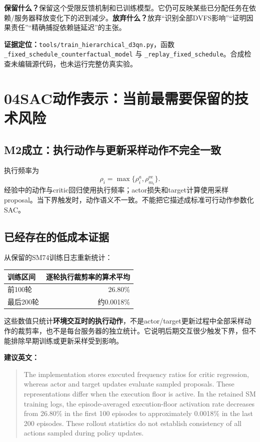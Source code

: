 \documentclass[UTF8,11pt,a4paper,fontset=fandol]{ctexart}
\newenvironment{draft}{\begin{quote}\small\setlength{\parskip}{4pt}}{\end{quote}}
\newcommand{\partpage}[2]{\section*{#1\quad #2}}
\newcommand{\code}[1]{\nolinkurl{#1}}
\begin{document}
\begin{decision}
\textbf{保留什么？}保留这个受限反馈机制和已训练模型。它仍可反映某些已分配任务在依赖/服务器释放变化下的迟到减少。\textbf{放弃什么？}放弃“识别全部DVFS影响”“证明因果责任”“精确捕捉依赖链延迟”的主张。
\end{decision}

\textbf{证据定位：}\code{tools/train_hierarchical_d3qn.py}，函数\newline
\code{_fixed_schedule_counterfactual_model} 与 \code{_replay_fixed_schedule}。合成检查未编辑源代码，也未运行完整仿真实验。

\newpage
\partpage{04}{SAC动作表示：当前最需要保留的技术风险}
\subsection*{M2成立：执行动作与更新采样动作不完全一致}
执行频率为
\[
\rho_i=\max\{\rho_i^a,\rho_{m_i}^{\mathrm{ee}}\}.
\]
经验中的动作与critic回归使用执行频率；actor损失和target计算使用采样proposal。当下界触发时，动作语义不一致。不能把它描述成标准可行动作参数化SAC。

\subsection*{已经存在的低成本证据}
从保留的SM74训练日志重新统计：
\begin{center}
\begin{tabular}{@{}lr@{}}
\toprule
训练区间 & 逐轮执行裁剪率的算术平均\\\midrule
前100轮 & 26.80\%\\
最后200轮 & 约0.0018\%\\\bottomrule
\end{tabular}
\end{center}
这些数值只统计\textbf{环境交互时的执行动作}，不是actor/target更新过程中全部采样动作的裁剪率，也不是每台服务器的独立统计。它说明后期交互很少触发下界，但不能排除早期训练或更新采样受到影响。

\textbf{建议英文：}
\begin{draft}
The implementation stores executed frequency ratios for critic regression, whereas actor and target updates evaluate sampled proposals. These representations differ when the execution floor is active. In the retained SM training logs, the episode-averaged execution-floor activation rate decreases from 26.80\% in the first 100 episodes to approximately 0.0018\% in the last 200 episodes. These rollout statistics do not establish consistency of all actions sampled during policy updates.
\end{draft}
\end{document}
